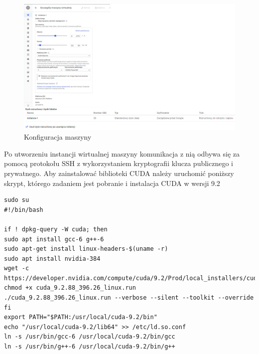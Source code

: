\begin{figure}[H]
	\centering
	\includegraphics[width=0.7\linewidth]{konfiguracja}
	\caption{Konfiguracja maszyny}
	\label{fig:konfiguracja}
\end{figure}
Po utworzeniu instancji wirtualnej maszyny komunikacja z nią odbywa się za pomocą protokołu SSH z wykorzystaniem kryptografii klucza publicznego i prywatnego. Aby zainstalować biblioteki CUDA należy uruchomić poniższy skrypt, którego zadaniem jest pobranie i instalacja CUDA w wersji 9.2

\begin{lstlisting}[caption={Skrypt instalacyjny sterowników CUDA},captionpos=b]
sudo su
#!/bin/bash

if ! dpkg-query -W cuda; then
sudo apt install gcc-6 g++-6
sudo apt-get install linux-headers-$(uname -r)
sudo apt install nvidia-384
wget -c https://developer.nvidia.com/compute/cuda/9.2/Prod/local_installers/cuda_9.2.88_396.26_linux
chmod +x cuda_9.2.88_396.26_linux.run
./cuda_9.2.88_396.26_linux.run --verbose --silent --toolkit --override
fi
export PATH="$PATH:/usr/local/cuda-9.2/bin"
echo "/usr/local/cuda-9.2/lib64" >> /etc/ld.so.conf
ln -s /usr/bin/gcc-6 /usr/local/cuda-9.2/bin/gcc
ln -s /usr/bin/g++-6 /usr/local/cuda-9.2/bin/g++
\end{lstlisting}

